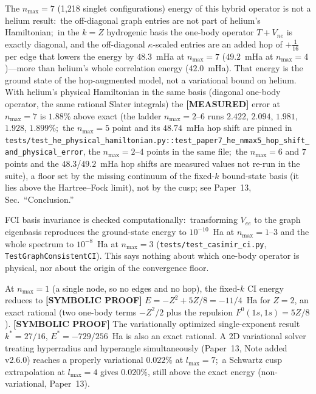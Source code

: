 \documentclass[aps,pra,twocolumn,superscriptaddress,longbibliography]{revtex4-2}
\newcommand{\gvq}[2]{#2}
\begin{document}
The $n_{\max} = 7$ (1,218 singlet configurations) energy of this hybrid
operator is not a helium result:\ the off-diagonal graph
entries are not part of helium's Hamiltonian;\ in the $k = Z$ hydrogenic
basis the one-body operator $T + V_{ne}$ is exactly diagonal, and the
off-diagonal $\kappa$-scaled entries are an added hop of $+\tfrac{1}{16}$
per edge that lowers the energy by $48.3$~mHa at $n_{\max} = 7$ ($49.2$~mHa at $n_{\max} = 4$)---more than
helium's whole correlation energy ($42.0$~mHa).  That energy is the
ground state of the hop-augmented model, not a variational bound on
helium.  With helium's physical Hamiltonian in the same basis (diagonal
one-body operator, the same rational Slater integrals) the
\textbf{[MEASURED]} error at $n_{\max} = 7$ is
$\gvq{he_gn_phys_n7_pct}{1.88}\%$ above exact (the ladder $n_{\max} = 2$--$6$ runs
$\gvq{he_gn_phys_n2_pct}{2.422}$, $\gvq{he_gn_phys_n3_pct}{2.094}$, $\gvq{he_gn_phys_n4_pct}{1.981}$, $\gvq{he_gn_phys_n5_pct}{1.928}$, $\gvq{he_gn_phys_n6_pct}{1.899}\%$;\ the $n_{\max} = 5$
point and its $48.74$~mHa hop shift are pinned in
\texttt{tests/test\_he\_physical\_hamiltonian.py::test\_paper7\_he\_nmax5\_hop\_shift\_and\_physical\_error},
the $n_{\max} = 2$--$4$ points in the same file;\ the $n_{\max} = 6$ and $7$ points and the $48.3$/$49.2$~mHa hop shifts are measured values not re-run in the suite), a floor set by the
missing continuum of the fixed-$k$ bound-state basis (it lies above the
Hartree--Fock limit), not by the cusp; see Paper~13, Sec.\ ``Conclusion.''

FCI basis invariance is checked computationally:\ transforming $V_{ee}$
to the graph eigenbasis reproduces the ground-state energy to
$10^{-10}$~Ha at $n_{\max} = 1$--$3$ and the whole spectrum to $10^{-8}$~Ha at
$n_{\max} = 3$ (\texttt{tests/test\_casimir\_ci.py},
\texttt{TestGraphConsistentCI}).  This says nothing about which one-body
operator is physical, nor about the origin of the convergence floor.

At $n_{\max} = 1$ (a single node, so no edges and no hop), the fixed-$k$ CI energy reduces to
\textbf{[SYMBOLIC PROOF]} $E = -Z^2 + 5Z/8 = -11/4$~Ha for $Z = 2$, an exact rational
(two one-body terms $-Z^2/2$ plus the repulsion $F^0(1s,1s) = 5Z/8$).
\textbf{[SYMBOLIC PROOF]} The variationally optimized single-exponent result $k^* = 27/16$,
$E^* = -729/256$~Ha is also an exact rational.
A 2D variational solver treating hyperradius and hyperangle
simultaneously (Paper~13, Note added v2.6.0) reaches a properly
variational $0.022\%$ at $l_{\max} = 7$;\ a Schwartz cusp extrapolation
at $l_{\max} = 4$ gives $0.020\%$, still above the exact energy
(non-variational, Paper~13).
\end{document}
